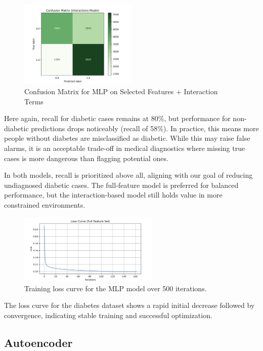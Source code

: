 \begin{figure}[H]
    \centering
    \includegraphics[width=0.5\textwidth]{images/confusion_matrix_interactions.png}
    \caption{Confusion Matrix for MLP on Selected Features + Interaction Terms}
\end{figure}

\noindent
Here again, recall for diabetic cases remains at 80\%, but performance for non-diabetic predictions drops noticeably (recall of 58\%). In practice, this means more people without diabetes are misclassified as diabetic. While this may raise false alarms, it is an acceptable trade-off in medical diagnostics where missing true cases is more dangerous than flagging potential ones.

\vspace{1em}
\noindent
In both models, recall is prioritized above all, aligning with our goal of reducing undiagnosed diabetic cases. The full-feature model is preferred for balanced performance, but the interaction-based model still holds value in more constrained environments.

\begin{figure}[H]
    \centering
    \includegraphics[width=0.6\textwidth]{images/mlp-loss-curve.png} 
    \caption{Training loss curve for the MLP model over 500 iterations.}
    \label{fig:mlp_loss_curve}
    \end{figure}

The loss curve for the diabetes dataset shows a rapid initial decrease followed by convergence, indicating stable training and successful optimization.


\subsection{Autoencoder}


